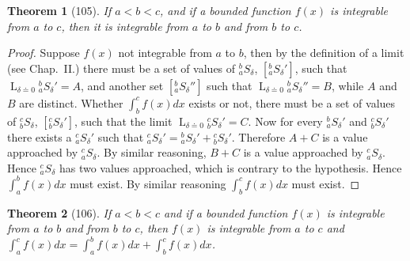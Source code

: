 \documentclass[a4paper,12pt]{book}[2004/02/16]
\providecommand{\colorbox}[2]{#2}
\newcommand{\correction}[2]{\colorbox{corr}{#1}}
\providecommand{\hyperlink}[2]{#2}
\providecommand{\hypertarget}[2]{#2}
\theoremstyle{ilemma}
\theoremstyle{itheorem}
\newtheorem{theorem}{Theorem}
\theoremstyle{iother}
\theoremstyle{icorollary}
\theoremstyle{numcorollary}
\theoremstyle{idefinition}
\begin{document}
\begin{theorem}[105]\hypertarget{thm105}{}
If $a<b<c$, and if a bounded function $f(x)$ is integrable from $a$ to
$c$, then it is integrable from $a$ to $b$ and from $b$ to $c$.
\end{theorem}

\begin{proof}
Suppose $f(x)$ not integrable from $a$ to $b$, then by the definition
of a limit (see Chap.~\hyperlink{chapII}{II}.) there must be a set of values of ${}^b_a
S_\delta$, $[{}^b_a S_\delta']$, such that
$\displaystyle\mathop{L}_{\delta \doteq 0} {}^b_a S_\delta' = A$,
and another set $[{}^b_a S_\delta'']$ such that
$\displaystyle\mathop{L}_{\delta \doteq 0} {}^b_a S_\delta'' = B$,
while $A$ and $B$ are distinct. Whether $\displaystyle\int_b^c f(x)
dx$ exists or not, there must be a set of values of ${}^c_b S_\delta$,
$[{}^c_b S_\delta']$, such that the limit
$\displaystyle\mathop{L}_{\delta \doteq 0} {}^c_b S_\delta' =
C$. Now for every ${}^b_a S_\delta'$ and ${}^c_b S_\delta'$ there
exists a ${}^c_a S_\delta'$ such that ${}^c_a S_\delta' = {}^b_a
S_\delta' + {}^c_b S_\delta'$. Therefore $A+C$ is a value
approached by ${}^c_a {S_\delta}$. By similar reasoning, $B+C$ is a
value approached by ${}^c_a {S_\delta}$. Hence ${}^c_a S_{\delta}$ has
two values approached, which is contrary to the hypothesis. Hence
$\displaystyle\int_a^b \text{\correction{$f$}{}}(x) dx$ must exist. By similar reasoning
$\displaystyle\int_b^c f(x) dx$ must exist.
\end{proof}

\begin{theorem}[106]\hypertarget{thm106}{}
If $a<b<c$ and if a bounded function $f(x)$ is integrable from $a$ to
$b$ and from $b$ to $c$, then $f(x)$ is integrable from $a$ to $c$ and
$\displaystyle\int_a^c f(x) dx = \int_a^b f(x) dx + \int_b^c f(x) dx$.
\end{theorem}
\end{document}
